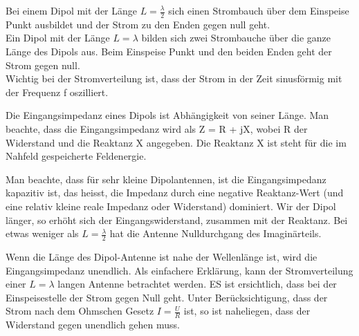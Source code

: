 
Bei einem Dipol mit der Länge  $L= \frac{\lambda}{2}$ sich einen Strombauch über dem Einspeise Punkt ausbildet und der Strom zu den Enden gegen null geht.\\
Ein Dipol mit der Länge  $L= \lambda$ bilden sich zwei  Strombauche über die ganze Länge des Dipols aus. Beim Einspeise Punkt und den beiden Enden geht der Strom gegen null.\\
Wichtig bei der Stromverteilung ist, dass der Strom  in der Zeit sinusförmig  mit der Frequenz f oszilliert. 



Die Eingangsimpedanz eines Dipols ist Abhängigkeit von seiner Länge. Man beachte, dass die Eingangsimpedanz wird als Z = R + jX, wobei R der Widerstand und die Reaktanz X angegeben. Die Reaktanz X ist steht für die im Nahfeld gespeicherte Feldenergie.


Man beachte, dass für sehr kleine Dipolantennen, ist die Eingangsimpedanz kapazitiv ist, das heisst, die Impedanz durch eine negative Reaktanz-Wert (und eine relativ kleine reale Impedanz oder Widerstand) dominiert. Wir der Dipol länger, so erhöht sich der Eingangswiderstand, zusammen mit der Reaktanz. Bei etwas weniger als $L=\frac{\lambda}{2}$ hat die Antenne Nulldurchgang des Imaginärteils.

Wenn die Länge des Dipol-Antenne ist nahe der Wellenlänge ist, wird die Eingangsimpedanz unendlich. Als einfachere Erklärung, kann der Stromverteilung einer $L = \lambda$ langen Antenne betrachtet werden. ES ist ersichtlich, dass bei der Einspeisestelle der Strom gegen Null geht. Unter Berücksichtigung, dass der Strom nach dem Ohmschen Gesetz $I = \frac{U}{R}$ ist, so ist naheliegen, dass der Widerstand gegen unendlich gehen muss. 

